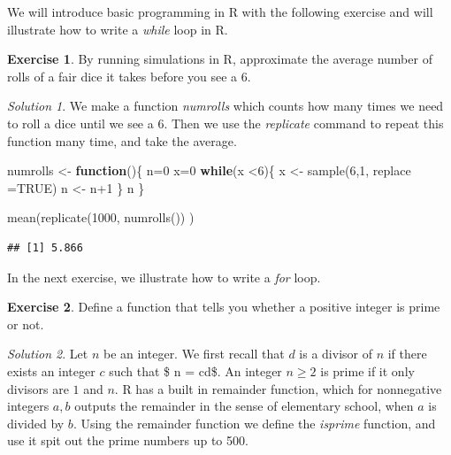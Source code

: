 \documentclass[
]{article}
\newenvironment{Shaded}{\begin{snugshade}}{\end{snugshade}}
\newcommand{\AttributeTok}[1]{\textcolor[rgb]{0.77,0.63,0.00}{#1}}
\newcommand{\ConstantTok}[1]{\textcolor[rgb]{0.00,0.00,0.00}{#1}}
\newcommand{\ControlFlowTok}[1]{\textcolor[rgb]{0.13,0.29,0.53}{\textbf{#1}}}
\newcommand{\DecValTok}[1]{\textcolor[rgb]{0.00,0.00,0.81}{#1}}
\newcommand{\FunctionTok}[1]{\textcolor[rgb]{0.00,0.00,0.00}{#1}}
\newcommand{\NormalTok}[1]{#1}
\newcommand{\OtherTok}[1]{\textcolor[rgb]{0.56,0.35,0.01}{#1}}
\newcommand{\SpecialCharTok}[1]{\textcolor[rgb]{0.00,0.00,0.00}{#1}}
\theoremstyle{definition}
\theoremstyle{definition}
\theoremstyle{definition}
\newtheorem{exercise}{Exercise}[section]
\theoremstyle{remark}
\newtheorem*{solution}{Solution}
\begin{document}
We will introduce basic programming in R with the following exercise and will illustrate how to write a \emph{while} loop in R.
\begin{exercise}
\protect\hypertarget{exr:unnamed-chunk-10}{}{\label{exr:unnamed-chunk-10} }By running simulations in R, approximate the average number of rolls of a fair dice it takes before you see a 6.
\end{exercise}
\begin{solution}
{}We make a function \emph{numrolls} which counts how many times we need to roll a dice until we see a \(6\). Then we use the \emph{replicate} command to repeat this function many time, and take the average.
\end{solution}

\begin{Shaded}
\begin{Highlighting}[]
\NormalTok{numrolls }\OtherTok{\textless{}{-}} \ControlFlowTok{function}\NormalTok{()\{}
\NormalTok{n}\OtherTok{=}\DecValTok{0}
\NormalTok{x}\OtherTok{=}\DecValTok{0}
\ControlFlowTok{while}\NormalTok{(x }\SpecialCharTok{\textless{}}\DecValTok{6}\NormalTok{)\{}
\NormalTok{x }\OtherTok{\textless{}{-}} \FunctionTok{sample}\NormalTok{(}\DecValTok{6}\NormalTok{,}\DecValTok{1}\NormalTok{, }\AttributeTok{replace =}\ConstantTok{TRUE}\NormalTok{)}
\NormalTok{n }\OtherTok{\textless{}{-}}\NormalTok{ n}\SpecialCharTok{+}\DecValTok{1}
\NormalTok{\}}
\NormalTok{n}
\NormalTok{\}}

\FunctionTok{mean}\NormalTok{(}\FunctionTok{replicate}\NormalTok{(}\DecValTok{1000}\NormalTok{, }\FunctionTok{numrolls}\NormalTok{()) )}
\end{Highlighting}
\end{Shaded}

\begin{verbatim}
## [1] 5.866
\end{verbatim}

In the next exercise, we illustrate how to write a \emph{for} loop.

\begin{exercise}
\protect\hypertarget{exr:unnamed-chunk-13}{}{\label{exr:unnamed-chunk-13} }Define a function that tells you whether a positive integer is prime or not.
\end{exercise}
\begin{solution}
{}Let \(n\) be an integer. We first recall that \(d\) is a divisor of \(n\) if there exists an integer \(c\) such that \$ n = cd\$. An integer \(n \geq 2\) is prime if it only divisors are \(1\) and \(n\). R has a built in remainder function, which for nonnegative integers \(a,b\) outputs the remainder in the sense of elementary school, when \(a\) is divided by \(b\). Using the remainder function we define the \emph{isprime} function, and use it spit out the prime numbers up to 500.
\end{solution}
\end{document}
